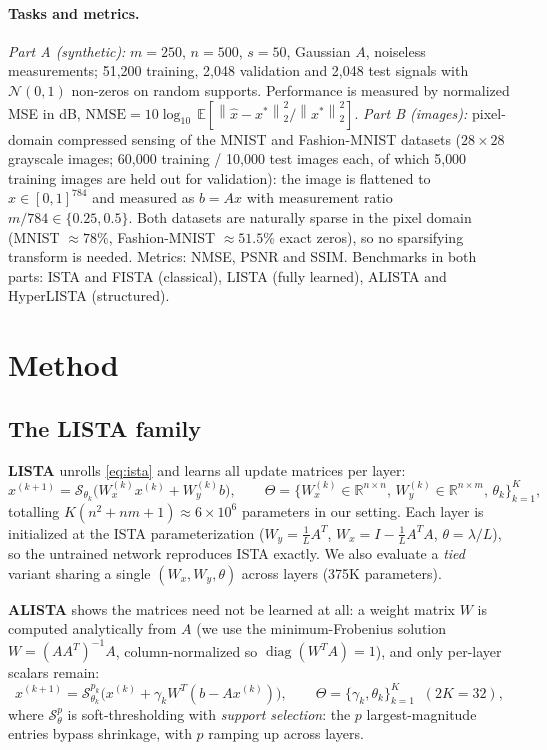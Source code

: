 \documentclass[12pt,a4paper]{article}
\newcommand{\norm}[1]{\left\lVert #1 \right\rVert}
\newcommand{\R}{\mathbb{R}}
\newcommand{\st}{\mathcal{S}}
\begin{document}
\paragraph{Tasks and metrics.}
\emph{Part A (synthetic):} $m=250$, $n=500$, $s=50$, Gaussian $A$, noiseless measurements; 51{,}200 training, 2{,}048 validation and 2{,}048 test signals with $\mathcal N(0,1)$ non-zeros on random supports. Performance is measured by normalized MSE in dB, $\mathrm{NMSE} = 10\log_{10}\, \mathbb E\!\left[ \norm{\hat x - x^*}_2^2 / \norm{x^*}_2^2 \right]$.
\emph{Part B (images):} pixel-domain compressed sensing of the MNIST and Fashion-MNIST datasets ($28\times28$ grayscale images; 60{,}000 training / 10{,}000 test images each, of which 5{,}000 training images are held out for validation): the image is flattened to $x\in[0,1]^{784}$ and measured as $b = Ax$ with measurement ratio $m/784 \in \{0.25, 0.5\}$. Both datasets are naturally sparse in the pixel domain (MNIST $\approx 78\%$, Fashion-MNIST $\approx 51.5\%$ exact zeros), so no sparsifying transform is needed. Metrics: NMSE, PSNR and SSIM. Benchmarks in both parts: ISTA and FISTA (classical), LISTA (fully learned), ALISTA and HyperLISTA (structured).

\section{Method}
\label{sec:method}

\subsection{The LISTA family}

\textbf{LISTA} \cite{gregor2010lista} unrolls \eqref{eq:ista} and learns all update matrices per layer:
\begin{equation}
x^{(k+1)} = \st_{\theta_k}\!\big( W_x^{(k)} x^{(k)} + W_y^{(k)} b \big),
\qquad \Theta = \{W_x^{(k)}\!\in\!\R^{n\times n},\, W_y^{(k)}\!\in\!\R^{n\times m},\, \theta_k\}_{k=1}^{K},
\end{equation}
totalling $K(n^2 + nm + 1) \approx 6\times10^6$ parameters in our setting. Each layer is initialized at the ISTA parameterization ($W_y = \frac1L A^T$, $W_x = I - \frac1L A^T\!A$, $\theta = \lambda/L$), so the untrained network reproduces ISTA exactly. We also evaluate a \emph{tied} variant sharing a single $(W_x, W_y, \theta)$ across layers (375K parameters).

\textbf{ALISTA} \cite{liu2019alista} shows the matrices need not be learned at all: a weight matrix $W$ is computed analytically from $A$ (we use the minimum-Frobenius solution $W = (AA^{T})^{-1}A$, column-normalized so $\operatorname{diag}(W^{T}A)=1$), and only per-layer scalars remain:
\begin{equation}
x^{(k+1)} = \st^{p_k}_{\theta_k}\!\big( x^{(k)} + \gamma_k W^{T}(b - A x^{(k)}) \big),
\qquad \Theta = \{\gamma_k, \theta_k\}_{k=1}^{K} \;\;(2K = 32),
\end{equation}
where $\st^{p}_{\theta}$ is soft-thresholding with \emph{support selection}: the $p$ largest-magnitude entries bypass shrinkage, with $p$ ramping up across layers.
\end{document}
